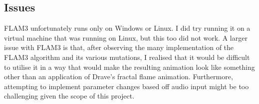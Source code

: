 \documentclass[../main_frameworkreview.tex]{subfiles}
\begin{document}
\subsection{Issues}
FLAM3 unfortunately runs only on Windows or Linux. I did try running it on a virtual machine that was running on Linux, but this too did not work. A larger issue with FLAM3 is that, after observing the many implementation of the FLAM3 algorithm and its various mutations, I realised that it would be difficult to utilise it in a way that would make the resulting animation look like something other than an application of Drave's fractal flame animation. Furthermore, attempting to implement parameter changes based off audio input might be too challenging given the scope of this project.
\end{document}
